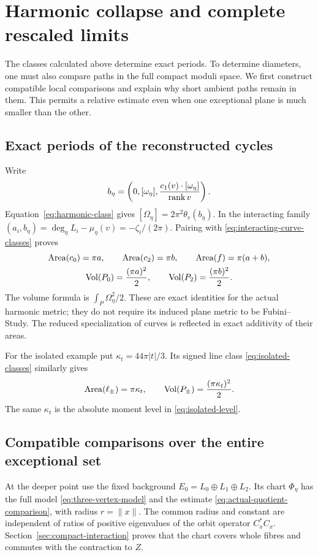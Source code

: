 \section{Harmonic collapse and complete rescaled limits}\label{sec:harmonic-limits}

The classes calculated above determine exact periods.
To determine diameters, one must also compare paths
in the full compact moduli space. We first construct
compatible local comparisons and explain why short
ambient paths remain in them. This permits a relative
estimate even when one exceptional plane is much
smaller than the other.

\subsection{Exact periods of the reconstructed cycles}
Write
\[
 b_\eta=\left(0,[\omega_\eta],
       \frac{c_1(v)\cdot[\omega_\eta]}{\operatorname{rank} v}\right).
\]
Equation~\eqref{eq:harmonic-class} gives
$[\Omega_\eta]=2\pi^2\theta_v(b_\eta)$.
In the interacting family
$(a_i,b_\eta)=\deg_\eta L_i-\mu_\eta(v)
=-\zeta_i/(2\pi)$. Pairing with
\eqref{eq:interacting-curve-classes} proves
\begin{equation}\label{eq:exact-cycle-volumes}
 \begin{gathered}
 \operatorname{Area}(c_0)=\pi a,\qquad
 \operatorname{Area}(c_2)=\pi b,\qquad
 \operatorname{Area}(f)=\pi(a+b),\\
 \operatorname{Vol}(P_0)=\frac{(\pi a)^2}{2},\qquad
 \operatorname{Vol}(P_2)=\frac{(\pi b)^2}{2}.
 \end{gathered}
\end{equation}
The volume formula is $\int_P\Omega_\eta^2/2$.
These are exact identities for the actual harmonic
metric; they do not require its induced plane
metric to be Fubini--Study. The reduced
specialization of curves is reflected in exact
additivity of their areas.

For the isolated example put
$\kappa_t=44\pi|t|/3$. Its signed line class
\eqref{eq:isolated-classes} similarly gives
\begin{equation}\label{eq:isolated-periods}
 \operatorname{Area}(\ell_\pm)=\pi\kappa_t,
 \qquad \operatorname{Vol}(P_\pm)=\frac{(\pi\kappa_t)^2}{2}.
\end{equation}
The same $\kappa_t$ is the absolute moment level
in \eqref{eq:isolated-level}.

\subsection{Compatible comparisons over the entire exceptional set}
At the deeper point use the fixed background
$E_0=L_0\oplus L_1\oplus L_2$. Its chart
$\Phi_\eta$ has the full model
\eqref{eq:three-vertex-model} and the estimate
\eqref{eq:actual-quotient-comparison}, with radius
$r=\|x\|$. The common radius and constant are
independent of ratios of positive eigenvalues
of the orbit operator $C_x^*C_x$.
Section~\ref{sec:compact-interaction} proves that
the chart covers whole fibres and commutes with
the contraction to $Z$.

